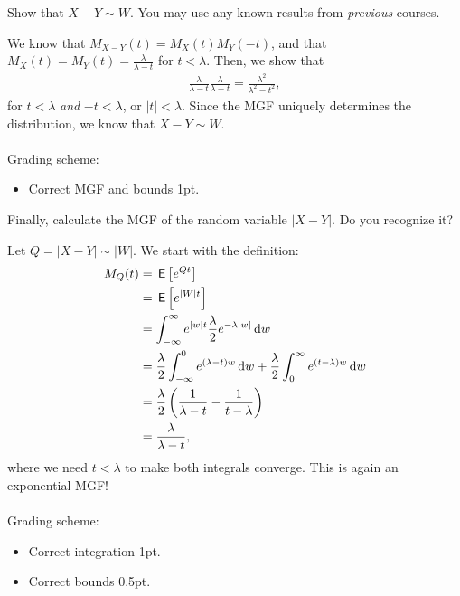 \begin{exercise}[1]
Show that $X-Y\sim W$. You may use any known results from \emph{previous} courses.
\begin{solution}
We know that $M_{X-Y}(t)=M_X(t)M_Y(-t)$, and that $M_X(t)=M_Y(t)=\frac{\lambda}{\lambda-t}$ for $t<\lambda.$ Then, we show that
\begin{align*}
    \frac{\lambda}{\lambda-t}\frac{\lambda}{\lambda+t} = \frac{\lambda^2}{\lambda^2-t^2},
\end{align*}
for $t<\lambda$ \emph{and} $-t<\lambda$, or $\left|t\right|<\lambda$. Since the MGF uniquely determines the distribution, we know that $X-Y\sim W$.
\\\\
Grading scheme:
\begin{itemize}
    \item Correct MGF and bounds 1pt.
\end{itemize}
\end{solution}
\end{exercise}

\begin{exercise}[1.5]
Finally, calculate the MGF of the random variable $\left|X-Y\right|$. Do you recognize it?
\begin{solution}
Let $Q = \left|X-Y\right| \sim \left|W\right|$.
We start with the definition:
\begin{align*}
    M_Q(t) &= \,\mathsf{E}\left[e^{Q t}\right]\\
    &= \,\mathsf{E}\left[e^{\left|W\right| t}\right]\\
    &= \int_{-\infty}^\infty{e^{\left|w\right| t}\frac{\lambda}{2}e^{-\lambda\left|w\right|}\,\textrm{d}w}\\
    &= \frac{\lambda}{2}\int_{-\infty}^0{e^{(\lambda-t)w}\,\textrm{d}w}+\frac{\lambda}{2}\int_0^\infty{e^{(t-\lambda)w}\,\textrm{d}w}\\
    &= \frac{\lambda}{2}\left(\frac{1}{\lambda-t}-\frac{1}{t-\lambda}\right)\\
    &= \frac{\lambda}{\lambda-t},
\end{align*}
where we need $t<\lambda$ to make both integrals converge. This is again an exponential MGF!
\\\\
Grading scheme:
\begin{itemize}
    \item Correct integration 1pt.
    \item Correct bounds 0.5pt.
\end{itemize}
\end{solution}
\end{exercise}
